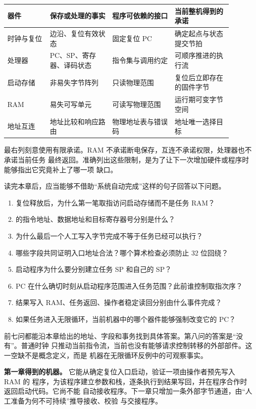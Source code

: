 \begin{longtable}{|L{0.17\linewidth}|L{0.25\linewidth}|L{0.25\linewidth}|L{0.23\linewidth}|}
\hline
{}
器件 & 保存或处理的事实 & 程序可依赖的接口 & 当前整机得到的承诺 \\ \hline
时钟与复位 & 边沿、复位有效状态 & 固定复位 PC & 确定起点与状态提交节拍 \\ \hline
处理器 & PC、SP、寄存器、译码状态 & 指令集与调用约定 & 可顺序推进的执行流 \\ \hline
启动存储 & 非易失字节阵列 & 只读物理范围 & 复位后立即存在的固件字节 \\ \hline
RAM & 易失可写单元 & 可读写物理范围 & 运行期可变字节空间 \\ \hline
地址互连 & 地址比较和响应路由 & 物理地址表与错误码 & 地址唯一选择目标 \\ \hline
\end{longtable}

最右列刻意使用有限承诺。RAM 不承诺断电保存，互连不承诺权限，处理器也不承诺当前任务
最终返回。准确列出这些限制，是为了让下一次增加硬件或程序时能够指出它究竟补上了哪一项
缺口。


读完本章后，应当能够不借助“系统自动完成”这样的句子回答以下问题。

\begin{enumerate}
\item 复位释放后，为什么第一笔取指访问启动存储而不是任务 RAM？
\item {} 的指令地址、数据地址和目标寄存器号分别是什么？
\item 为什么最后一个人工写入字节完成不等于任务已经可以执行？
\item 哪些字段共同证明入口地址合法？哪个算术检查必须防止 32 位回绕？
\item 启动程序为什么要分别建立任务 SP 和自己的 SP？
\item PC 在什么确切时刻从启动程序范围进入任务范围？此前谁控制取指次序？
\item 结果写入 RAM、任务返回、操作者稳定读回分别由什么事件完成？
\item 如果任务进入无限循环，当前机器中的哪个器件能够强制改变它的 PC？
\end{enumerate}

前七问都能沿本章给出的地址、字段和事务找到具体答案。第八问的答案是“没有”。普通时钟
只推动当前指令流，当前也没有能够请求控制转移的外部部件。这一空缺不是概念定义，而是
机器在无限循环反例中的可观察事实。

\begin{problemframe}
\textbf{第一章得到的机器。} 它能从确定复位入口启动，验证一项由操作者预先写入 RAM 的
程序，为该程序建立参数和栈，逐条执行到结果写回，并在程序合作时返回启动代码。它尚不能
自动接收程序。下一章只增加一条外部字节通道，由“人工准备为何不可持续”推导接收、校验
与交接程序。
\end{problemframe}

